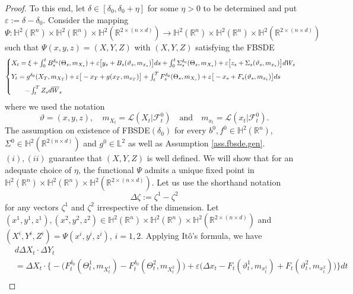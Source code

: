 \documentclass[11pt,reqno]{amsart}
\numberwithin{equation}{section}
\theoremstyle{definition}
\def\R{{\mathbb R}}
\def\P{{\mathcal P}}
\def\L{{\mathcal L}}
\newcommand{\ov}{\overline}
\newcommand\cF{\mathcal F}
\newcommand\cL{\mathcal L}
\def \H{\mathbb{H}}
\def \L{\mathbb{L}}
\def \P{\mathbb{P}}
\def \R{\mathbb{R}}
\begin{document}
\begin{proof}
  To this end, let $\delta \in [\delta_0, \delta_0+\eta]$ for some $\eta>0$ to be determined and put $\varepsilon := \delta - \delta_0$.
  Consider the mapping $\Psi:\H^2(\R^n)\times \H^2(\R^n)\times \H^2(\R^{2\times(n\times d)})\to \H^2(\R^n)\times \H^2(\R^n)\times \H^2(\R^{2\times(n\times d)})$ such that $\Psi(x, y, z) = (X,Y,Z)$ with $(X,Y,Z)$ satisfying the FBSDE
  \begin{equation}
  \begin{cases}\vspace{.2cm}
    X_t = \xi + \int_0^tB^{\delta_0}_s(\Theta_s,m_{X_s}) + \varepsilon\big[y_s + B_s(\vartheta_s,m_{x_s})\big] ds + \int_0^t\Sigma^{\delta_0}_s(\Theta_s,m_{X_s}) + \varepsilon\big[z_s + \Sigma_s(\vartheta_s, m_{x_s}) \big]dW_s\\\vspace{.2cm}
    Y_t = g^{\delta_0}(X_T, m_{X_T}) + \varepsilon\big[-x_T + g(x_T, m_{x_T})\big] + \int_t^TF^{\delta_0}_s(\Theta_s, m_{X_s}) + \varepsilon\big[-x_s + F_s(\vartheta_s, m_{x_t})\big]ds \\
    \qquad - \int_t^TZ_sd\ov W_s
  \end{cases}
  \end{equation}
  where we used the notation
   $$\vartheta = (x, y, z),\quad m_{X_t} = \cL(X_t|\cF_t^0)\quad \text{and}\quad m_{x_t} = \cL(x_t|\cF_t^0).$$
  The assumption on existence of FBSDE$(\delta_0)$ for every $b^0, f^0\in \H^2(\R^n)$, $\Sigma^0\in \H^2(\R^{2(n\times d)})$ and $g^0\in \L^2$ as well as Assumption \ref{ass.fbsde.gen}.$(i), (ii)$ guarantee that $(X, Y, Z)$ is well defined.
  We will show that for an adequate choice of $\eta$, the functional $\Psi$ admits a unique fixed point in $\H^2(\R^n)\times \H^2(\R^n)\times \H^2(\R^{2\times(n\times d)})$.
  Let us use the shorthand notation 
  $$\Delta \zeta:= \zeta^1 - \zeta^2$$ 
  for any vectors $\zeta^1$ and $ \zeta^2$ irrespective of the dimension. 
  Let $(x^1, y^1, z^1), (x^2, y^2, z^2)\in \H^2(\R^n)\times \H^2(\R^n)\times \H^2(\R^{2\times(n\times d)})$ and $(X^i, Y^i, Z^i) = \Psi(x^i, y^i, z^i)$, $i=1,2$.
  Applying It\^o's formula, we have
  \begin{align*}
    &d\Delta X_t\cdot\Delta Y_t\\
     &= \Delta X_t\cdot\Big\{ -\big(F^{\delta_0}_t(\Theta_t^1,m_{X^1_t}) - F^{\delta_0}_t(\Theta^2_t, m_{X^2_t})\big) + \varepsilon\big( \Delta x_t - F_t(\vartheta^1_t, m_{x^1_t}) + F_t(\vartheta_t^2, m_{x^2_t})) \Big\}dt\\

\end{align*}
\end{proof}
\end{document}
